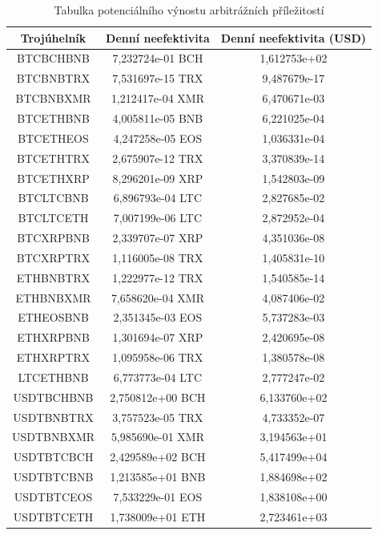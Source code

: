 \documentclass[thesis=B,czech]{FITthesis}[2019/03/21]
\begin{document}
\begin{table}\centering
\caption{Tabulka potenciálního výnostu arbitrážních příležitostí}
\label{table_gains}
\begin{tabular}{|| c | c | c ||}\hline Trojúhelník & Denní neefektivita & Denní neefektivita (USD)\\ [0.5ex]
 \hline\hline BTCBCHBNB & 7,232724e-01 BCH & 1,612753e+02\\ 
 \hline BTCBNBTRX & 7,531697e-15 TRX & 9,487679e-17\\ 
 \hline BTCBNBXMR & 1,212417e-04 XMR & 6,470671e-03\\ 
 \hline BTCETHBNB & 4,005811e-05 BNB & 6,221025e-04\\ 
 \hline BTCETHEOS & 4,247258e-05 EOS & 1,036331e-04\\ 
 \hline BTCETHTRX & 2,675907e-12 TRX & 3,370839e-14\\ 
 \hline BTCETHXRP & 8,296201e-09 XRP & 1,542803e-09\\ 
 \hline BTCLTCBNB & 6,896793e-04 LTC & 2,827685e-02\\ 
 \hline BTCLTCETH & 7,007199e-06 LTC & 2,872952e-04\\ 
 \hline BTCXRPBNB & 2,339707e-07 XRP & 4,351036e-08\\ 
 \hline BTCXRPTRX & 1,116005e-08 TRX & 1,405831e-10\\ 
 \hline ETHBNBTRX & 1,222977e-12 TRX & 1,540585e-14\\ 
 \hline ETHBNBXMR & 7,658620e-04 XMR & 4,087406e-02\\ 
 \hline ETHEOSBNB & 2,351345e-03 EOS & 5,737283e-03\\ 
 \hline ETHXRPBNB & 1,301694e-07 XRP & 2,420695e-08\\ 
 \hline ETHXRPTRX & 1,095958e-06 TRX & 1,380578e-08\\ 
 \hline LTCETHBNB & 6,773773e-04 LTC & 2,777247e-02\\ 
 \hline USDTBCHBNB & 2,750812e+00 BCH & 6,133760e+02\\ 
 \hline USDTBNBTRX & 3,757523e-05 TRX & 4,733352e-07\\ 
 \hline USDTBNBXMR & 5,985690e-01 XMR & 3,194563e+01\\ 
 \hline USDTBTCBCH & 2,429589e+02 BCH & 5,417499e+04\\ 
 \hline USDTBTCBNB & 1,213585e+01 BNB & 1,884698e+02\\ 
 \hline USDTBTCEOS & 7,533229e-01 EOS & 1,838108e+00\\ 
 \hline USDTBTCETH & 1,738009e+01 ETH & 2,723461e+03\\ 

\end{tabular}
\end{table}
\end{document}
